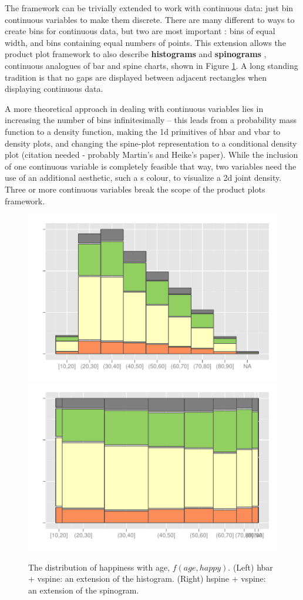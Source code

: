 \documentclass[journal]{vgtc}
\begin{document}
The framework can be trivially extended to work with continuous data: just  bin continuous variables to make them discrete. There are many different to ways to create bins for continuous data, but two are most important \citep{denby:2009}: bins of equal width, and bins containing equal numbers of points. This extension allows the product plot framework to also describe {\bf histograms} and {\bf spinograms} \citep{hummel:1996}, continuous analogues of bar and spine charts, shown in Figure \ref{fig:cont-examples}. A long standing tradition is that no gaps are displayed between adjacent rectangles when displaying continuous data. 

A more theoretical approach in dealing with continuous variables  lies in increasing the number of bins infinitesimally -- this leads from a probability mass function to a density function, making the 1d primitives of hbar and vbar to density plots, and changing the spine-plot representation to a conditional density plot (citation needed - probably Martin's and Heike's paper). While the inclusion of one continuous variable is completely feasible that way, two variables need the use of an additional aesthetic, such a s colour,  to visualize a 2d joint density. Three or more continuous variables break the scope of the product plots framework.

\begin{figure}[htbp]
  \centering
  \includegraphics[width=0.5\linewidth]{cont-hbar}%
  \includegraphics[width=0.5\linewidth]{cont-hspine}
  
  \caption{The distribution of happiness with age, $f(age, happy)$. (Left) hbar + vspine: an extension of the histogram. (Right) hspine + vspine: an extension of the spinogram.}
  \label{fig:cont-examples}
\end{figure}
\end{document}

